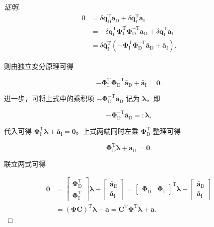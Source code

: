 \begin{proof}[证明]
\[
\begin{aligned}
0&=\delta\bar{\boldsymbol{q}}_{\mathrm{D}}^{\mathrm{T}}\bar{\boldsymbol{a}}_{\mathrm{D}}+\delta\bar{\boldsymbol{q}}_{\mathrm{I}}^{\mathrm{T}}\bar{\boldsymbol{a}}_{\mathrm{I}}\\
&=-\delta\bar{\boldsymbol{q}}_{\mathrm{I}}^{\mathrm{T}}\boldsymbol{\Phi}_{\mathrm{I}}^{\mathrm{T}}\boldsymbol{\Phi}_{\mathrm{D}}^{-\mathrm{T}}\bar{\boldsymbol{a}}_{\mathrm{D}}+\delta\bar{\boldsymbol{q}}_{\mathrm{I}}^{\mathrm{T}}\bar{\boldsymbol{a}}_{\mathrm{I}}\\
&=\delta\bar{\boldsymbol{q}}_{\mathrm{I}}^{\mathrm{T}}\left(-\boldsymbol{\Phi}_{\mathrm{I}}^{\mathrm{T}}\boldsymbol{\Phi}_{\mathrm{D}}^{-\mathrm{T}}\bar{\boldsymbol{a}}_{\mathrm{D}}+\bar{\boldsymbol{a}}_{\mathrm{I}}\right).
\end{aligned}
\]

则由独立变分原理可得

\[
-\boldsymbol{\Phi}_{\mathrm{I}}^{\mathrm{T}}\boldsymbol{\Phi}_{\mathrm{D}}^{-\mathrm{T}}\bar{\boldsymbol{a}}_{\mathrm{D}}+\bar{\boldsymbol{a}}_{\mathrm{I}}=\boldsymbol{0}.
\]

进一步，可将上式中的乘积项 $-\boldsymbol{\Phi}_{\mathrm{D}}^{-\mathrm{T}}\bar{\boldsymbol{a}}_{\mathrm{D}}$ 记为 $\boldsymbol{\lambda}$，即

\[
-\boldsymbol{\Phi}_{\mathrm{D}}^{-\mathrm{T}}\bar{\boldsymbol{a}}_{\mathrm{D}}=:\boldsymbol{\lambda},
\]

代入可得 $\boldsymbol{\Phi}_{\mathrm{I}}^{\mathrm{T}}\boldsymbol{\lambda}+\bar{\boldsymbol{a}}_{\mathrm{I}}=\boldsymbol{0}$。上式两端同时左乘 $\boldsymbol{\Phi}_{\mathrm{D}}^{\mathrm{T}}$ 整理可得

\[
\boldsymbol{\Phi}_{\mathrm{D}}^{\mathrm{T}}\boldsymbol{\lambda}+\bar{\boldsymbol{a}}_{\mathrm{D}}=\boldsymbol{0}.
\]

联立两式可得

\[
\begin{aligned}
\boldsymbol{0}&=\begin{bmatrix}\boldsymbol{\Phi}_{\mathrm{D}}^{\mathrm{T}}\\\boldsymbol{\Phi}_{\mathrm{I}}^{\mathrm{T}}\end{bmatrix}\boldsymbol{\lambda}+\begin{bmatrix}\bar{\boldsymbol{a}}_{\mathrm{D}}\\\bar{\boldsymbol{a}}_{\mathrm{I}}\end{bmatrix}=\begin{bmatrix}\boldsymbol{\Phi}_{\mathrm{D}}&\boldsymbol{\Phi}_{\mathrm{I}}\end{bmatrix}^{\mathrm{T}}\boldsymbol{\lambda}+\begin{bmatrix}\bar{\boldsymbol{a}}_{\mathrm{D}}\\\bar{\boldsymbol{a}}_{\mathrm{I}}\end{bmatrix}\\
&=(\boldsymbol{\Phi}\boldsymbol{C})^{\mathrm{T}}\boldsymbol{\lambda}+\bar{\boldsymbol{a}}=\boldsymbol{C}^{\mathrm{T}}\boldsymbol{\Phi}^{\mathrm{T}}\boldsymbol{\lambda}+\bar{\boldsymbol{a}}.
\end{aligned}
\]


\end{proof}

